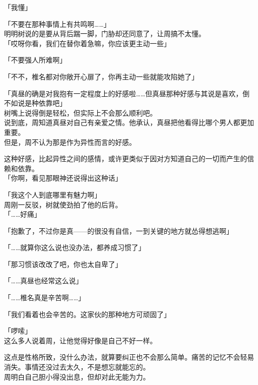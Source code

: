 「我懂」

「不要在那种事情上有共鸣啊……」\\

明明树说的是要从背后踹一脚，门胁却还同意了，让周搞不太懂。\\

「哎呀你看，我们在替你着急嘛，你应该更主动一些」

「不要强人所难啊」

「不不，椎名都对你敞开心扉了，你再主动一些就能攻陷她了」

「真昼的确是对我抱有一定程度上的好感啦……但真昼那种好感与其说是喜欢，倒不如说是种依靠吧」\\

树嘴上说得倒是轻松，但实际上不会那么顺利吧。\\

说到底，周知道真昼对自己有亲爱之情。他承认，真昼把他看得比哪个男人都更加重要。\\

但是，周不认为那是作为异性而言的好感。

这种好感，比起异性之间的感情，或许更类似于因对方知道自己的一切而产生的信赖和依靠。\\

「你啊，看见那眼神还说得出这种话」

「我这个人到底哪里有魅力啊」\\

周刚一反驳，树就使劲拍了他的后背。\\

「……好痛」

「抱歉了，不过你是真——的很没有自信，一到关键的地方就怂得想逃啊」

「……就算你这么说也没办法，都养成习惯了」

「那习惯该改改了吧，你也太自卑了」

「……真昼也经常这么说」

「……椎名真是辛苦啊……」

「我们看着也会辛苦的。这家伙的那种地方可顽固了」

「啰嗦」\\

这么多人说着周，让他觉得好像是自己不好一样。

这点是性格所致，没什么办法，就算要纠正也不会那么简单。痛苦的记忆不会轻易消失。事情还没过去太久，不是想忘就能忘的。\\

周明白自己胆小得没出息，但却对此无能为力。\\

